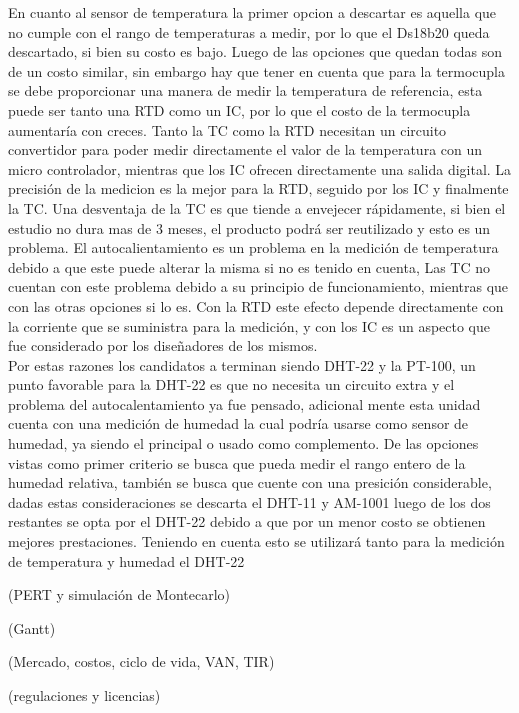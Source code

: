 En cuanto al sensor de temperatura la primer opcion a descartar es aquella que no cumple con el rango de temperaturas a medir, por lo que el Ds18b20 queda descartado, si bien su costo es bajo. Luego de las opciones que quedan todas son de un costo similar, sin embargo hay que tener en cuenta que para la termocupla se debe proporcionar una manera de medir la temperatura de referencia, esta puede ser tanto una RTD como un IC, por lo que el costo de la termocupla aumentaría con creces. Tanto la TC como la RTD necesitan un circuito convertidor para poder medir directamente el valor de la temperatura con un micro controlador, mientras que los IC ofrecen directamente una salida digital. La precisión de la medicion es la mejor para la RTD, seguido por los IC y finalmente la TC. Una desventaja de la TC es que tiende a envejecer rápidamente, si bien el estudio no dura mas de 3 meses, el producto podrá ser reutilizado y esto es un problema. El autocalientamiento es un problema en la medición de temperatura debido a que este puede alterar la misma si no es tenido en cuenta, Las TC no cuentan con este problema debido a su principio de funcionamiento, mientras que con las otras opciones si lo es. Con la RTD este efecto depende directamente con la corriente que se suministra para la medición, y con los IC es un aspecto que fue considerado por los diseñadores de los mismos.\\
Por estas razones los candidatos a terminan siendo DHT-22 y la PT-100, un punto favorable para la DHT-22 es que no necesita un circuito extra y el problema del autocalentamiento ya fue pensado, adicional mente esta unidad cuenta con una medición de humedad la cual podría usarse como sensor de humedad, ya siendo el principal o usado como complemento.
De las opciones vistas como primer criterio se busca que pueda medir el rango entero de la humedad relativa, también se busca que cuente con una presición considerable, dadas estas consideraciones se descarta el DHT-11 y AM-1001 luego de los dos restantes se opta por el DHT-22 debido a que por un menor costo se obtienen mejores prestaciones.
Teniendo en cuenta esto se utilizará tanto para la medición de temperatura y humedad el DHT-22


(PERT y simulación de Montecarlo)

(Gantt)

(Mercado, costos, ciclo de vida, VAN, TIR)

(regulaciones y licencias)



